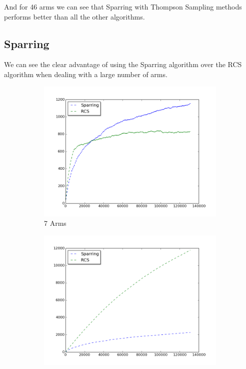 \documentclass{llncs}
\begin{document}
And for 46 arms we can see that Sparring with Thompson Sampling methods performs better than all the other algorithms.


\subsection{Sparring}

We can see the clear advantage of using the Sparring algorithm over the RCS algorithm when dealing with a large number of arms.
\begin{figure}[h!]
\centering
\begin{subfigure}{.5\textwidth}
  \centering
  \includegraphics[scale=0.3]{figures/rcs_sparring_MQ2007_7arms.png}
  \caption{7 Arms}
  \label{fig:sub1}
\end{subfigure}%
\begin{subfigure}{.5\textwidth}
  \centering
  \includegraphics[scale=0.3]{figures/rcs_sparring_MQ2007_16arms.png}

\end{subfigure}
\end{figure}
\end{document}
